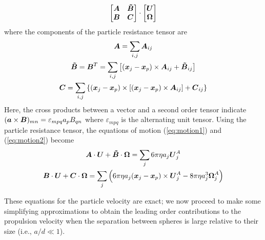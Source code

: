 \begin{appendices}
\begin{equation}
\begin{bmatrix}
        \boldsymbol{A} & \boldsymbol{\tilde{B}} \\ 
        \boldsymbol{B} & \boldsymbol{C} 
    \end{bmatrix} 
    \cdot
    \begin{bmatrix} \boldsymbol{U} \\ \boldsymbol{\Omega} \end{bmatrix}\label{eq:stokesParticle}
\end{equation}
where the components of the particle resistance tensor are 
\begin{gather}
    \boldsymbol{A} = \sum_{i,j} \boldsymbol{A}_{ij} \label{eq:A}
    \\
    \boldsymbol{\tilde{B}} = \boldsymbol{B}^T = \sum_{i,j} \left[(\boldsymbol{x}_j -\boldsymbol{x}_p) \times \boldsymbol{A}_{ij} + \boldsymbol{\tilde{B}}_{ij} \right] \label{eq:B}
    \\
    \boldsymbol{C} = \sum_{i,j}\left\{(\boldsymbol{x}_j -\boldsymbol{x}_p) \times [(\boldsymbol{x}_j -\boldsymbol{x}_p) \times \boldsymbol{A}_{ij}] + \boldsymbol{C}_{ij}\right\} \label{eq:C}
\end{gather}
Here, the cross products between a vector and a second order tensor indicate $(\boldsymbol{a}\times\boldsymbol{B})_{mn}=\varepsilon_{mpq} a_p B_{qn}$ where $\varepsilon_{mpq}$ is the alternating unit tensor.  Using the particle resistance tensor, the equations of motion (\ref{eq:motion1}) and (\ref{eq:motion2}) become
\begin{gather}
    \boldsymbol{A}\cdot \boldsymbol{U} + \boldsymbol{\tilde{B}} \cdot \boldsymbol{\Omega} = \sum_j 6\pi \eta a_j \boldsymbol{U}^A_j
    \\
    \boldsymbol{B}\cdot \boldsymbol{U} + \boldsymbol{C} \cdot \boldsymbol{\Omega}  = \sum_j  \left(6 \pi \eta a_j (\boldsymbol{x}_j-\boldsymbol{x}_p)\times\boldsymbol{U}^A_j  - 8\pi\eta a_j^3\boldsymbol{\Omega}^{A}_j\right)
\end{gather}

These equations for the particle velocity are exact; we now proceed to make some simplifying approximations to obtain the leading order contributions to the propulsion velocity when the separation between spheres is large relative to their size (i.e., $a/d\ll 1$).


\end{appendices}

